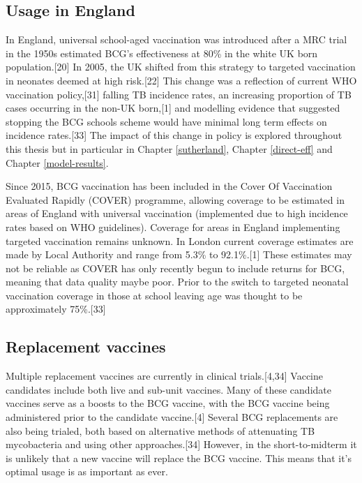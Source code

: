 \documentclass[11pt,twoside]{bristolthesis}
\begin{document}
  \hypertarget{usage-in-england}{%
  \subsection{Usage in England}\label{usage-in-england}}
  
  In England, universal school-aged vaccination was introduced after a MRC trial in the 1950s estimated BCG's effectiveness at 80\% in the white UK born population.{[}20{]} In 2005, the UK shifted from this strategy to targeted vaccination in neonates deemed at high risk.{[}22{]} This change was a reflection of current WHO vaccination policy,{[}31{]} falling TB incidence rates, an increasing proportion of TB cases occurring in the non-UK born,{[}1{]} and modelling evidence that suggested stopping the BCG schools scheme would have minimal long term effects on incidence rates.{[}33{]} The impact of this change in policy is explored throughout this thesis but in particular in Chapter \ref{sutherland}, Chapter \ref{direct-eff} and Chapter \ref{model-results}.
  
  Since 2015, BCG vaccination has been included in the Cover Of Vaccination Evaluated Rapidly (COVER) programme, allowing coverage to be estimated in areas of England with universal vaccination (implemented due to high incidence rates based on WHO guidelines). Coverage for areas in England implementing targeted vaccination remains unknown. In London current coverage estimates are made by Local Authority and range from 5.3\% to 92.1\%.{[}1{]} These estimates may not be reliable as COVER has only recently begun to include returns for BCG, meaning that data quality maybe poor. Prior to the switch to targeted neonatal vaccination coverage in those at school leaving age was thought to be approximately 75\%.{[}33{]}
  
  \hypertarget{replacement-vaccines}{%
  \subsection{Replacement vaccines}\label{replacement-vaccines}}
  
  Multiple replacement vaccines are currently in clinical trials.{[}4,34{]} Vaccine candidates include both live and sub-unit vaccines. Many of these candidate vaccines serve as a boosts to the BCG vaccine, with the BCG vaccine being administered prior to the candidate vaccine.{[}4{]} Several BCG replacements are also being trialed, both based on alternative methods of attenuating TB mycobacteria and using other approaches.{[}34{]} However, in the short-to-midterm it is unlikely that a new vaccine will replace the BCG vaccine. This means that it's optimal usage is as important as ever.
  
\end{document}
